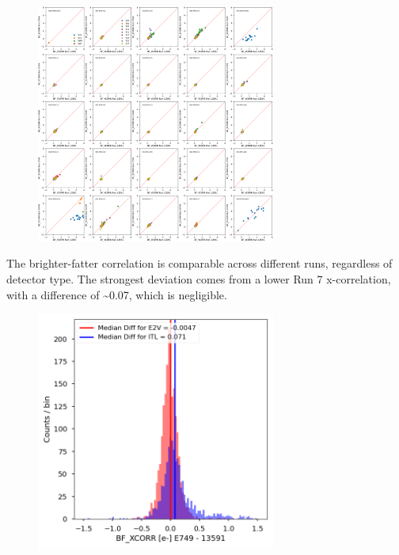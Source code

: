 \begin{figure}[H]
\begin{centering}
\includegraphics[width=0.7\textwidth]{figures/baselineCharacterization/13591_E749_BF_YCORR.png}
\end{centering}
\end{figure}

The brighter-fatter correlation is comparable across different runs, regardless of detector type. The strongest deviation comes from a lower Run 7 x-correlation, with a difference of \textasciitilde0.07, which is negligible.

\begin{figure}[H]
\begin{centering}
\includegraphics[width=0.7\textwidth]{figures/baselineCharacterization/BF_XCORR_13591_E749_diff.png}
\end{centering}
\end{figure}

